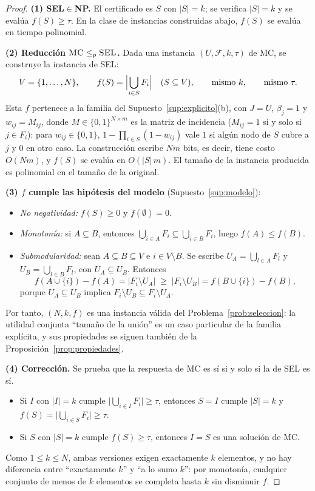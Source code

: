 \documentclass[11pt,a4paper]{article}
\theoremstyle{definition}
\theoremstyle{plain}
\begin{document}
\begin{proof}
\textbf{(1) \textsc{SEL}$\in$NP.} El certificado es $S$ con $|S|=k$; se
verifica $|S|=k$ y se evalúa $f(S)\ge\tau$. En la clase de instancias
construidas abajo, $f(S)$ se evalúa en tiempo polinomial.

\textbf{(2) Reducción $\textsc{MC}\le_p\textsc{SEL}$.} Dada una instancia
$(U,\mathcal{F},k,\tau)$ de \textsc{MC}, se construye la instancia de
\textsc{SEL}:
\[
  V=\{1,\dots,N\},\qquad
  f(S)=\Bigl|\bigcup_{i\in S}F_i\Bigr|\quad(S\subseteq V),\qquad
  \text{mismo }k,\qquad\text{mismo }\tau .
\]
Esta $f$ pertenece a la familia del Supuesto~\ref{sup:explicito}(b), con
$J=U$, $\beta_j=1$ y $w_{ij}=M_{ij}$, donde $M\in\{0,1\}^{N\times m}$ es la
matriz de incidencia ($M_{ij}=1$ si y solo si $j\in F_i$): para $w_{ij}\in\{0,1\}$,
$1-\prod_{i\in S}(1-w_{ij})$ vale $1$ si algún nodo de $S$ cubre a $j$ y $0$ en
otro caso. La
construcción escribe $Nm$ bits, es decir, tiene costo $O(Nm)$, y $f(S)$ se evalúa
en $O(|S|\,m)$. El tamaño de la instancia producida es polinomial en el tamaño
de la original.

\textbf{(3) $f$ cumple las hipótesis del modelo} (Supuesto~\ref{sup:modelo}):
\begin{itemize}[leftmargin=*]
  \item \emph{No negatividad:} $f(S)\ge0$ y $f(\emptyset)=0$.
  \item \emph{Monotonía:} si $A\subseteq B$, entonces
  $\bigcup_{i\in A}F_i\subseteq\bigcup_{i\in B}F_i$, luego $f(A)\le f(B)$.
  \item \emph{Submodularidad:} sean $A\subseteq B\subseteq V$ e
  $i\in V\setminus B$. Se escribe $U_A=\bigcup_{l\in A}F_l$ y
  $U_B=\bigcup_{l\in B}F_l$, con $U_A\subseteq U_B$. Entonces
  \[
    f(A\cup\{i\})-f(A)=|F_i\setminus U_A|
    \;\ge\;|F_i\setminus U_B|=f(B\cup\{i\})-f(B),
  \]
  porque $U_A\subseteq U_B$ implica $F_i\setminus U_B\subseteq F_i\setminus U_A$.
\end{itemize}
Por tanto, $(N,k,f)$ es una instancia válida del
Problema~\ref{prob:seleccion}: la utilidad conjunta ``tamaño de la unión'' es
un caso particular de la familia explícita, y sus propiedades se siguen también
de la Proposición~\ref{prop:propiedades}.

\textbf{(4) Corrección.} Se prueba que la respuesta de \textsc{MC} es sí si y
solo si la de \textsc{SEL} es sí.
\begin{itemize}[leftmargin=*]
  \item[$\Rightarrow$] Si $I$ con $|I|=k$ cumple
  $\bigl|\bigcup_{i\in I}F_i\bigr|\ge\tau$, entonces $S=I$ cumple $|S|=k$ y
  $f(S)=\bigl|\bigcup_{i\in S}F_i\bigr|\ge\tau$.
  \item[$\Leftarrow$] Si $S$ con $|S|=k$ cumple $f(S)\ge\tau$, entonces
  $I=S$ es una solución de \textsc{MC}.
\end{itemize}
Como $1\le k\le N$, ambas versiones exigen exactamente $k$ elementos, y no hay
diferencia entre ``exactamente $k$'' y ``a lo sumo $k$'': por monotonía,
cualquier conjunto de menos de $k$ elementos se completa hasta $k$ sin
disminuir $f$.


\end{proof}
\end{document}
